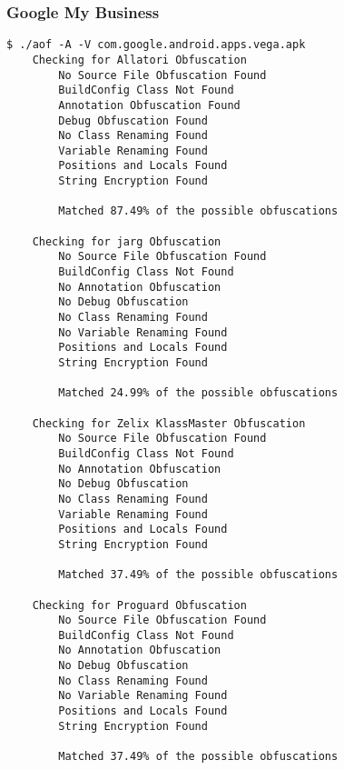 \subsubsection{Google My Business \cite{gbis}}
\label{app:gbusiness}
\begin{lstlisting}
$ ./aof -A -V com.google.android.apps.vega.apk
    Checking for Allatori Obfuscation
        No Source File Obfuscation Found
        BuildConfig Class Not Found
        Annotation Obfuscation Found
        Debug Obfuscation Found
        No Class Renaming Found
        Variable Renaming Found
        Positions and Locals Found
        String Encryption Found

        Matched 87.49% of the possible obfuscations

    Checking for jarg Obfuscation
        No Source File Obfuscation Found
        BuildConfig Class Not Found
        No Annotation Obfuscation
        No Debug Obfuscation
        No Class Renaming Found
        No Variable Renaming Found
        Positions and Locals Found
        String Encryption Found

        Matched 24.99% of the possible obfuscations

    Checking for Zelix KlassMaster Obfuscation
        No Source File Obfuscation Found
        BuildConfig Class Not Found
        No Annotation Obfuscation
        No Debug Obfuscation
        No Class Renaming Found
        Variable Renaming Found
        Positions and Locals Found
        String Encryption Found

        Matched 37.49% of the possible obfuscations

    Checking for Proguard Obfuscation
        No Source File Obfuscation Found
        BuildConfig Class Not Found
        No Annotation Obfuscation
        No Debug Obfuscation
        No Class Renaming Found
        No Variable Renaming Found
        Positions and Locals Found
        String Encryption Found

        Matched 37.49% of the possible obfuscations
\end{lstlisting}
\newpage
